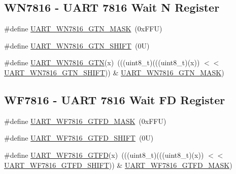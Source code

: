 \subsection*{W\+N7816 -\/ U\+A\+RT 7816 Wait N Register}
\begin{DoxyCompactItemize}
\item 
\#define \mbox{\hyperlink{group___u_a_r_t___register___masks_ga2ca85f017d51ef94ac685ce60d365795}{U\+A\+R\+T\+\_\+\+W\+N7816\+\_\+\+G\+T\+N\+\_\+\+M\+A\+SK}}~(0x\+F\+F\+U)
\item 
\#define \mbox{\hyperlink{group___u_a_r_t___register___masks_gab7deaf09ea769ec9cb28b66bfc90d141}{U\+A\+R\+T\+\_\+\+W\+N7816\+\_\+\+G\+T\+N\+\_\+\+S\+H\+I\+FT}}~(0\+U)
\item 
\#define \mbox{\hyperlink{group___u_a_r_t___register___masks_gace5f01806058a7519f09ca698a48dedd}{U\+A\+R\+T\+\_\+\+W\+N7816\+\_\+\+G\+TN}}(x)~(((uint8\+\_\+t)(((uint8\+\_\+t)(x)) $<$$<$ \mbox{\hyperlink{group___u_a_r_t___register___masks_gab7deaf09ea769ec9cb28b66bfc90d141}{U\+A\+R\+T\+\_\+\+W\+N7816\+\_\+\+G\+T\+N\+\_\+\+S\+H\+I\+FT}})) \& \mbox{\hyperlink{group___u_a_r_t___register___masks_ga2ca85f017d51ef94ac685ce60d365795}{U\+A\+R\+T\+\_\+\+W\+N7816\+\_\+\+G\+T\+N\+\_\+\+M\+A\+SK}})
\end{DoxyCompactItemize}
\subsection*{W\+F7816 -\/ U\+A\+RT 7816 Wait FD Register}
\begin{DoxyCompactItemize}
\item 
\#define \mbox{\hyperlink{group___u_a_r_t___register___masks_gafe82535b1014fd5cc4cfd50169d743ac}{U\+A\+R\+T\+\_\+\+W\+F7816\+\_\+\+G\+T\+F\+D\+\_\+\+M\+A\+SK}}~(0x\+F\+F\+U)
\item 
\#define \mbox{\hyperlink{group___u_a_r_t___register___masks_ga721ba0567ed0305bffa0ee30353aa2c8}{U\+A\+R\+T\+\_\+\+W\+F7816\+\_\+\+G\+T\+F\+D\+\_\+\+S\+H\+I\+FT}}~(0\+U)
\item 
\#define \mbox{\hyperlink{group___u_a_r_t___register___masks_ga1deec30c17d2cc28d8db76346756785f}{U\+A\+R\+T\+\_\+\+W\+F7816\+\_\+\+G\+T\+FD}}(x)~(((uint8\+\_\+t)(((uint8\+\_\+t)(x)) $<$$<$ \mbox{\hyperlink{group___u_a_r_t___register___masks_ga721ba0567ed0305bffa0ee30353aa2c8}{U\+A\+R\+T\+\_\+\+W\+F7816\+\_\+\+G\+T\+F\+D\+\_\+\+S\+H\+I\+FT}})) \& \mbox{\hyperlink{group___u_a_r_t___register___masks_gafe82535b1014fd5cc4cfd50169d743ac}{U\+A\+R\+T\+\_\+\+W\+F7816\+\_\+\+G\+T\+F\+D\+\_\+\+M\+A\+SK}})
\end{DoxyCompactItemize}
